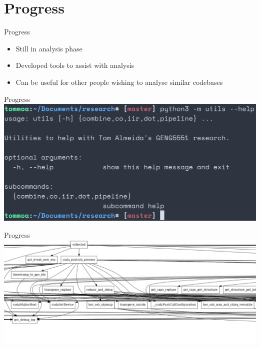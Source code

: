 \documentclass{beamer}
\begin{document}
\section{Progress}
\begin{frame}{Progress}
    \begin{itemize}
        \item Still in analysis phase
        \pause{} \item Developed tools to assist with analysis
        \item Can be useful for other people wishing to analyse similar
            codebases
    \end{itemize}
\end{frame}
\begin{frame}{Progress}
    \centering \includegraphics[width=\textwidth]{utils.png}
\end{frame}
\begin{frame}{Progress}
    \centering
    \includegraphics[width=\textwidth]{callgraph.png}
\end{frame}
\end{document}
